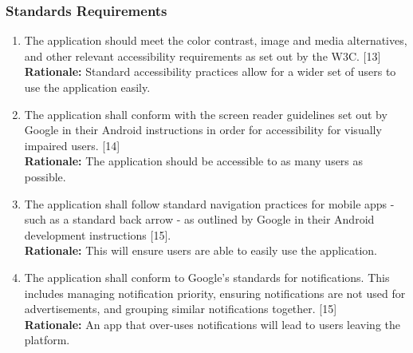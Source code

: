 \documentclass[]{article}
\begin{document}
\subsubsection{Standards Requirements}
\label{ssub:standards_requirements}
\begin{enumerate}[{LR-STD}1. ]
	\item The application should meet the color contrast, image and media alternatives, and other relevant accessibility requirements as set out by the W3C. [13] \\
    \textbf{Rationale:}  Standard accessibility practices allow for a wider set of users to use the application easily.
	\item The application shall conform with the screen reader guidelines set out by Google in their Android instructions in order for accessibility for visually impaired users. [14] \\
    \textbf{Rationale:}  The application should be accessible to as many users as possible.
	\item The application shall follow standard navigation practices for mobile apps - such as a standard back arrow - as outlined by Google in their Android development instructions [15]. \\ 
    \textbf{Rationale:} This will ensure users are able to easily use the application. 
	\item The application shall conform to Google’s standards for notifications. This includes managing notification priority, ensuring notifications are not used for advertisements, and grouping similar notifications together. [15] \\
    \textbf{Rationale:} An app that over-uses notifications will lead to users leaving the platform.
\end{enumerate}

\end{document}
